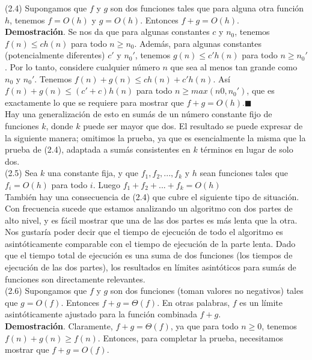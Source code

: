 \documentclass[a4paper]{article}
\begin{document}
(2.4) Supongamos que $f$ y $g$ son dos funciones tales que para alguna otra función $h$, tenemos $f = O (h)$ y $g = O (h)$. Entonces $f + g = O (h)$.\\

\textbf{Demostración}. Se nos da que para algunas constantes $c$ y $n_0$, tenemos $f(n)≤ch(n)$ para todo $n≥n_0$. Además, para algunas constantes (potencialmente diferentes) $c'$ y $n_0'$, tenemos $g(n)≤c'h(n)$ para todo $n≥n_0'$. Por lo tanto, considere cualquier número $n$ que sea al menos tan grande como $n_0$ y $n_0'$. Tenemos $f(n) + g (n) ≤ ch (n) + c'h (n)$. Así $f (n) + g (n) ≤ (c' + c) h (n)$ para todo $n≥max(n0, n_0')$, que es exactamente lo que se requiere para mostrar que $f + g = O (h)$.$\blacksquare$ \\

Hay una generalización de esto en sumás de un número constante fijo de funciones $k$, donde $k$ puede ser mayor que dos. El resultado se puede expresar de la siguiente manera; omitimos la prueba, ya que es esencialmente la misma que la prueba de (2.4), adaptada a sumás consistentes en $k$ términos en lugar de solo dos.\\

(2.5) Sea $k$ una constante fija, y que $f_1, f_2, ..., f_k$ y $h$ sean funciones tales que $f_i = O(h)$ para todo $i$. Luego $f_1 + f_2 + ... + f_k = O (h)$\\

También hay una consecuencia de (2.4) que cubre el siguiente tipo de situación. Con frecuencia sucede que estamos analizando un algoritmo con dos partes de alto nivel, y es fácil mostrar que una de las dos partes es más lenta que la otra. Nos gustaría poder decir que el tiempo de ejecución de todo el algoritmo es asintóticamente comparable con el tiempo de ejecución de la parte lenta. Dado que el tiempo total de ejecución es una suma de dos funciones (los tiempos de ejecución de las dos partes), los resultados en límites asintóticos para sumás de funciones son directamente relevantes.\\


(2.6) Supongamos que $f$ y $g$ son dos funciones (toman valores no negativos) tales que $g = O (f)$. Entonces $f + g = \Theta(f)$. En otras palabras, $f$ es un límite asintóticamente ajustado para la función combinada $f + g$.\\

\textbf{Demostración}. Claramente, $f + g = \Theta (f)$, ya que para todo $n ≥ 0$, tenemos $f (n) + g (n) ≥ f (n)$. Entonces, para completar la prueba, necesitamos mostrar que $f + g = O (f)$. \\
\end{document}

